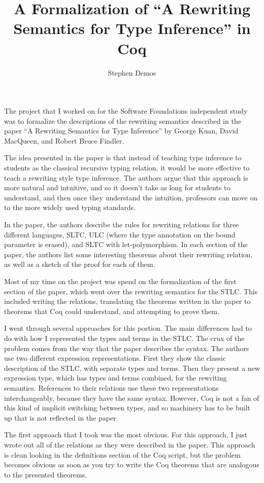 \documentclass[12pt]{article}
\title{A Formalization of ``A Rewriting Semantics for Type Inference'' in Coq}
\author{Stephen Demos}
\begin{document}
\maketitle

The project that I worked on for the Software Foundations independent study was
to formalize the descriptions of the rewriting semantics described in the paper
``A Rewriting Semantics for Type Inference'' by George Kuan, David MacQueen,
and Robert Bruce Findler.

The idea presented in the paper is that instead of teaching type inference to
students as the classical recursive typing relation, it would be more effective
to teach a rewriting style type inference. The authors argue that this approach
is more natural and intuitive, and so it doesn't take as long for students to
understand, and then once they understand the intuition, professors can move on
to the more widely used typing standards.

In the paper, the authors describe the rules for rewriting relations for three
different languages, SLTC, ULC (where the type annotation on the bound
parameter is erased), and SLTC with let-polymorphism. In each section of the
paper, the authors list some interesting theorems about their rewriting
relation, as well as a sketch of the proof for each of them.

Most of my time on the project was spend on the formalization of the first
section of the paper, which went over the rewriting semantics for the STLC.
This included writing the relations, translating the theorems written in the
paper to theorems that Coq could understand, and attempting to prove them.

I went through several approaches for this portion. The main differences had to
do with how I represented the types and terms in the STLC. The crux of the
problem comes from the way that the paper describes the syntax. The authors use
two different expression representations. First they show the classic
description of the STLC, with separate types and terms. Then they present a new
expression type, which has types and terms combined, for the rewriting
semantics. References to their relations use these two representations
interchangeably, because they have the same syntax. However, Coq is not a fan
of this kind of implicit switching between types, and so machinery has to be
built up that is not reflected in the paper. 

The first approach that I took was the most obvious. For this approach, I just
wrote out all of the relations as they were described in the paper. This
approach is clean looking in the definitions section of the Coq script, but the
problem becomes obvious as soon as you try to write the Coq theorems that are
analogous to the presented theorems.
\end{document}
